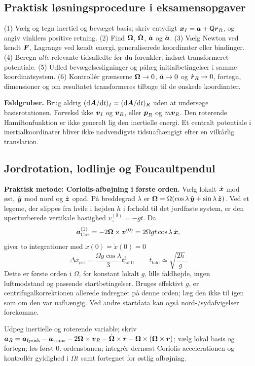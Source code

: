 \subsection{Praktisk løsningsprocedure i eksamensopgaver}\label{sec:rotmethod}
\begin{method}
(1) Vælg og tegn inertiel og bevæget basis; skriv entydigt $\boldsymbol{x}_I=\boldsymbol{a}+\mathsf Q\boldsymbol{r}_R$, og angiv vinklers positive retning.
(2) Find $\boldsymbol{\Omega}$, $\dot{\boldsymbol{\Omega}}$, $\dot{\boldsymbol{a}}$ og $\ddot{\boldsymbol{a}}$.
(3) Vælg Newton ved kendt $\boldsymbol{F}$, Lagrange ved kendt energi, generaliserede koordinater eller bindinger.
(4) Beregn \emph{alle} relevante tidsafledte før du forenkler; indsæt transformeret potentiale.
(5) Udled bevægelsesligninger og pålæg initialbetingelser i samme koordinatsystem.
(6) Kontrollér grænserne $\boldsymbol{\Omega}\to0$, $\ddot{\boldsymbol{a}}\to0$ og $\dot{\boldsymbol{r}}_R\to0$, fortegn, dimensioner og om resultatet transformeres tilbage til de ønskede koordinater.
\end{method}
\textbf{Faldgruber.} Brug aldrig $(\mathrm d\boldsymbol{A}/\mathrm d t)_I=(\mathrm d\boldsymbol{A}/\mathrm d t)_R$ uden at undersøge basisrotationen. Forveksl ikke $\boldsymbol{v}_I$ og $\boldsymbol{v}_R$, eller $\boldsymbol{p}_R$ og $m\boldsymbol{v}_R$. Den roterende Hamiltonfunktion er ikke generelt lig den inertielle energi. Et centralt potentiale i inertialkoordinater bliver ikke nødvendigvis tidsuafhængigt efter en vilkårlig translation.

\subsection{Jordrotation, lodlinje og Foucaultpendul}
\textbf{Praktisk metode: Coriolis-afbøjning i første orden.}
Vælg lokalt $\hat{\boldsymbol{x}}$ mod øst, $\hat{\boldsymbol{y}}$ mod nord og $\hat{\boldsymbol{z}}$ opad. På breddegrad $\lambda$ er
$\boldsymbol{\Omega}=\Omega(\cos\lambda\,\hat{\boldsymbol{y}}+\sin\lambda\,\hat{\boldsymbol{z}})$.
Ved et legeme, der slippes fra hvile i højden $h$ i forhold til det jordfaste system, er den uperturberede vertikale hastighed
$v_z^{(0)}=-gt$. Da
\[
\boldsymbol{a}_{\mathrm{Cor}}^{(1)}=-2\boldsymbol{\Omega}\times
\boldsymbol{v}^{(0)}
=2\Omega gt\cos\lambda\,\hat{\boldsymbol{x}},
\]
giver to integrationer med $x(0)=\dot x(0)=0$
\[
\boxed{\Delta x_{\mathrm{øst}}
=\frac{\Omega g\cos\lambda}{3}t_{\mathrm{fald}}^3,
\qquad t_{\mathrm{fald}}\simeq\sqrt{\frac{2h}{g}}.}
\]
Dette er første orden i $\Omega$, for konstant lokalt $g$, lille faldhøjde, ingen luftmodstand og passende startbetingelser. Bruges effektivt $g$, er centrifugalkorrektionen allerede indregnet på denne orden; læg den ikke til igen som om den var uafhængig. Ved andre startdata kan også nord-/sydafvigelser forekomme.
\begin{method}Udpeg inertielle og roterende variable; skriv $\boldsymbol{a}_R=\boldsymbol{a}_{\rm fysisk}-\boldsymbol{a}_{\rm trans}-2\boldsymbol{\Omega}\times\boldsymbol{v}_R-\dot{\boldsymbol{\Omega}}\times\boldsymbol{r}-\boldsymbol{\Omega}\times(\boldsymbol{\Omega}\times\boldsymbol{r})$; vælg lokal basis og fortegn; løs først 0.-ordensbanen; integrér dernæst Coriolis-accelerationen og kontrollér gyldighed i $\Omega t$ samt fortegnet for østlig afbøjning.\end{method}

